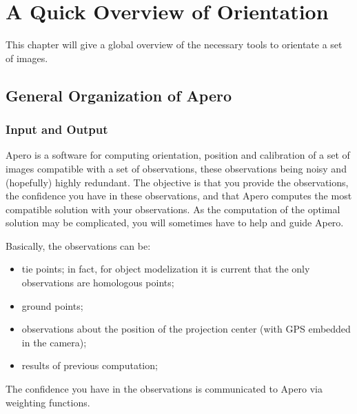 \chapter{A Quick Overview of Orientation}

This chapter will give a global overview of the necessary tools
to orientate a set of images.


\label{Intro:QuickApero}


\section{General Organization of Apero}

\subsection{Input and Output}

Apero is a software for computing orientation, position and calibration
of a set of images compatible with a set of observations, these
observations being noisy and (hopefully) highly redundant.
The objective is that you provide the observations,
the confidence you have in these observations, and that
Apero computes the most compatible  solution with your
observations. As the computation of the
optimal solution may be complicated, you will sometimes
have to help and guide Apero.

Basically, the observations can be:

\begin{itemize}
    \item  tie points; in fact, for object modelization it is current that
           the only observations are homologous points;

    \item  ground points;

    \item  observations about the position of the projection center (with GPS embedded in the camera);

    \item  results of previous computation;

\end{itemize}

The confidence you have in the observations is communicated to Apero via weighting functions.

